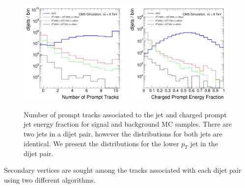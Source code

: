 \begin{figure}
\centering
\includegraphics[width=0.49\textwidth]{plots/discrimination/disc_NPromptTracks.pdf}
\includegraphics[width=0.49\textwidth]{plots/discrimination/disc_PromptEnergyFrac.pdf}
\caption{Number of prompt tracks associated to the jet and charged prompt jet energy fraction for signal and
background MC samples. There are two jets in a dijet pair, however the distributions for both jets are identical.
We present the distributions for the lower $p_T$ jet in the dijet pair.
\label{fig:discprompt}}

\end{figure}

Secondary vertices are sought among the tracks associated with each dijet pair 
using two different algorithms. 

